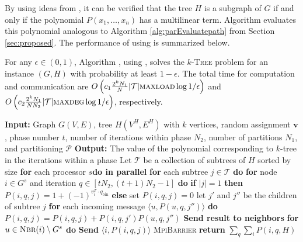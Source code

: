 By using ideas from \cite{alon2008biomolecular}, it can be verified that the tree $H$ is a subgraph of $G$ if and only if the
polynomial $P(x_1,\ldots,x_n)$ has a multilinear term. Algorithm \parcircuittree{}
evaluates this polynomial analogous to Algorithm \ref{alg:parEvaluatepath} from Section \ref{sec:proposed}. The performance of \ouralgo{} using \parcircuittree{} is summarized below.

\begin{lemma}
\label{lemma:parmaxwt-tree}
For any $\epsilon\in(0, 1)$,
Algorithm \ouralgo{}, using \parcircuittree{}, solves the \textsc{$k$-Tree} problem for an
instance $(G, H)$ with probability at least $1-\epsilon$. The total time for
computation and communication are $O\left(c_1\frac{2^kN_1}{N}|\mathcal{T}| \textsc{maxload}{}\log{1/\epsilon}\right)$ 
and $O\left(c_2\frac{2^kN_1}{N N_2}|\mathcal{T}| \textsc{maxdeg}{}\log{1/\epsilon}\right)$, respectively.
\end{lemma}

\begin{algorithm}{}
\small
\caption{}
\label{alg:parEvaluatepath} 
\begin{algorithmic}[1]
\STATE \textbf{Input:} Graph $G(V, E)$, tree $H(V^H, E^H)$ with $k$ vertices, 
random assignment $\mathbf{v}$, phase number $t$, number of iterations within phase $N_2$,
number of partitions $N_1$, and partitioning $\mathcal{P}$
\STATE \textbf{Output:} The value of the polynomial corresponding to $k$-tree in the iterations within a phase
\STATE
\STATE Let $\mathcal{T}$ be a collection of subtrees of $H$ sorted by size
\STATE \textbf{for} each processor $s$\textbf{do in parallel}
\STATE \quad \textbf{for} each subtree $j \in \mathcal{T}$ \textbf{do}
\STATE \quad \quad \textbf{for} node $i\in G^s$ and iteration $q\in [tN_2,(t+1)N_2 - 1]$ \textbf{do}
\STATE \quad \quad \quad \textbf{if} $|j|=1$ \textbf{then}
\STATE \quad \quad \quad \quad $P(i, q, j) = 1 + (-1)^{v_i^T \cdot q_{\text{bin}}}$
\STATE \quad \quad \quad \textbf{else}
\STATE \quad \quad \quad \quad set $P(i,q, j) = 0$
\STATE \quad \quad \quad \quad let $j'$ and $j''$ be the children of subtree $j$
\STATE \quad \quad \quad \quad \quad \textbf{for} each incoming message $\langle u, P(u, q, j'')\rangle$ \textbf{do}
\STATE \quad \quad \quad \quad \quad \quad $P(i, q, j)= P(i, q, j) + P(i, q, j')  P(u, q, j'')$
\STATE \quad \quad \quad \textbf{Send result to neighbors}
\STATE \quad \quad \quad  \textbf{for} $u \in \textsc{Nbr}(i)\setminus G^s$ \textbf{do}
\STATE \quad \quad \quad \quad \textbf{Send} $\langle i, P(i, q, j)\rangle$
\STATE \textsc{MpiBarrier}
\STATE \textbf{return} $\sum_q \sum_i P(i, q, H)$
\end{algorithmic}
\end{algorithm}

